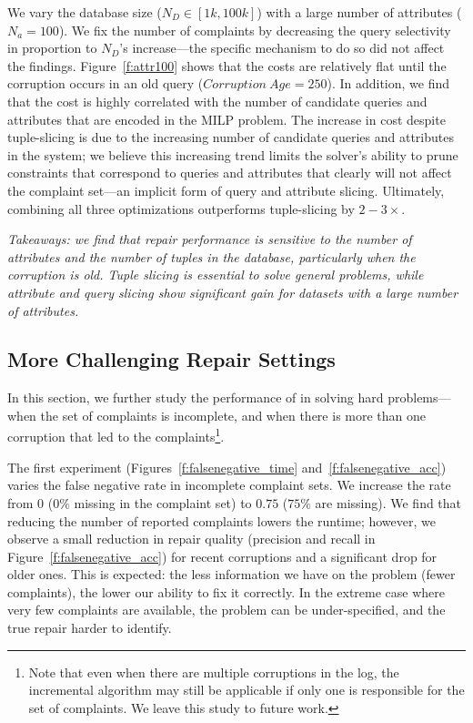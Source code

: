  
We vary the database size ($N_D \in [1k, 100k]$) with a large number of attributes ($N_a = 100$).
We fix the number of complaints by decreasing the query selectivity in proportion to $N_D$'s increase---the specific mechanism to do so did not affect the findings.
Figure~\ref{f:attr100} shows that the costs are relatively flat until the corruption occurs in an old query ($Corruption\ Age = 250$).  
In addition, we find that the cost is highly correlated with the number of candidate queries and attributes that are encoded in the MILP problem.
The increase in cost despite tuple-slicing is due to the increasing number of candidate queries and attributes in the system; 
we believe this increasing trend limits the solver's ability to prune constraints that correspond to queries and attributes that 
clearly will not affect the complaint set---an implicit form of query and attribute slicing.  
Ultimately, combining all three optimizations outperforms tuple-slicing by $2-3\times$.

\smallskip
\textit{
  Takeaways: we find that repair performance is sensitive to 
  the number of attributes and the number of tuples in the database, particularly when the corruption is old. 
  Tuple slicing is essential to solve general problems, while attribute and query slicing show significant gain for datasets with a large number of attributes.
}



\subsection{More Challenging Repair Settings}
\label{sec:experiments:hardprob}

In this section, we further study the performance of \sys in solving hard problems---when the set of complaints is incomplete, and when there is more than one corruption that led to the complaints\footnote{
\footnotesize Note that even when there are multiple corruptions in the log, the incremental algorithm may still be applicable if only one is responsible for the set of complaints.  We leave this study to future work.}.
 
 
The first experiment (Figures~\ref{f:falsenegative_time} and~\ref{f:falsenegative_acc}) varies the false negative rate in incomplete complaint sets.
We increase the rate from $0$ ($0\%$ missing in the complaint set) to $0.75$ ($75\%$ are missing).  
We find that reducing the number of reported complaints lowers the
runtime; however, we observe a small reduction in repair quality (precision
and recall in Figure~\ref{f:falsenegative_acc}) for recent corruptions and a
significant drop for older ones. This is expected: the less information we
have on the problem (fewer complaints), the lower our ability to fix it
correctly. In the extreme case where very few complaints are available, the
problem can be under-specified, and the true repair harder to identify.


